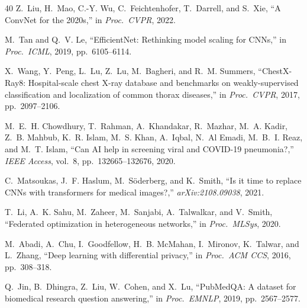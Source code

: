 \documentclass[conference]{IEEEtran}
\begin{document}
\begin{thebibliography}{40}
Z.~Liu, H.~Mao, C.-Y. Wu, C.~Feichtenhofer, T.~Darrell, and S.~Xie,
``A ConvNet for the 2020s,'' in \emph{Proc.\ CVPR}, 2022.

M.~Tan and Q.~V. Le,
``EfficientNet: Rethinking model scaling for CNNs,''
in \emph{Proc.\ ICML}, 2019, pp.\ 6105--6114.

X.~Wang, Y.~Peng, L.~Lu, Z.~Lu, M.~Bagheri, and R.~M. Summers,
``ChestX-Ray8: Hospital-scale chest X-ray database and benchmarks on
weakly-supervised classification and localization of common thorax diseases,''
in \emph{Proc.\ CVPR}, 2017, pp.\ 2097--2106.

M.~E.~H. Chowdhury, T.~Rahman, A.~Khandakar, R.~Mazhar, M.~A. Kadir,
Z.~B. Mahbub, K.~R. Islam, M.~S. Khan, A.~Iqbal, N.~Al Emadi,
M.~B.~I. Reaz, and M.~T. Islam,
``Can AI help in screening viral and COVID-19 pneumonia?,'' 
\emph{IEEE Access}, vol.\ 8, pp.\ 132665--132676, 2020.

C.~Matsoukas, J.~F. Haslum, M.~S{\"o}derberg, and K.~Smith,
``Is it time to replace CNNs with transformers for medical images?,'' 
\emph{arXiv:2108.09038}, 2021.

T.~Li, A.~K. Sahu, M.~Zaheer, M.~Sanjabi, A.~Talwalkar, and V.~Smith,
``Federated optimization in heterogeneous networks,''
in \emph{Proc.\ MLSys}, 2020.

M.~Abadi, A.~Chu, I.~Goodfellow, H.~B. McMahan, I.~Mironov, K.~Talwar,
and L.~Zhang,
``Deep learning with differential privacy,''
in \emph{Proc.\ ACM CCS}, 2016, pp.\ 308--318.

Q.~Jin, B.~Dhingra, Z.~Liu, W.~Cohen, and X.~Lu,
``PubMedQA: A dataset for biomedical research question answering,''
in \emph{Proc.\ EMNLP}, 2019, pp.\ 2567--2577.

\end{thebibliography}
\end{document}
